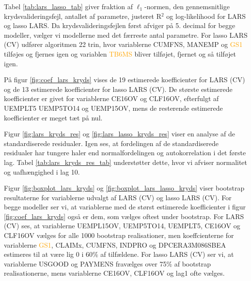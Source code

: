 
Tabel \ref{tab:lars_lasso_tab} giver fraktion af \(\ell_1\)-normen, den gennemsnitlige krydsvalideringsfejl, antallet af parametre, justeret R$^2$ og log-likelihood for LARS og lasso LARS.
Da krydsvalideringsfejlen først afviger på 5. decimal for begge modeller, vælger vi modellerne med det færreste antal parametre. 
For lasso LARS (CV) udfører algoritmen 22 trin, hvor variablerne  \textcolor{chartreuse4}{CUMFNS}, \textcolor{blue3}{MANEMP} og \textcolor{orange}{GS1} tilføjes og fjernes igen og 
variablen \textcolor{orange}{TB6MS} bliver tilføjet, fjernet og så tilføjet igen.  

%

%
På figur \ref{fig:coef_lars_kryds} vises de 19 estimerede koefficienter for LARS (CV) og de 13 estimerede koefficienter for lasso LARS (CV). 
De største estimerede koefficienter er givet for variablerne \textcolor{blue3}{CE16OV} og \textcolor{blue3}{CLF16OV}, efterfulgt af \textcolor{blue3}{UEMPLT5} \textcolor{blue3}{UEMP5TO14} og \textcolor{blue3}{UEMP15OV}, mens de resterende estimerede koefficienter er meget tæt på nul.



Figur \ref{fig:lars_kryds_res} og \ref{fig:lars_lasso_kryds_res} viser en analyse af de standardiserede residualer.
Igen ses, at fordelingen af de standardiserede residualer har tungere haler end normalfordelingen og autokorrelation i det første lag. 
Tabel \ref{tab:lars_kryds_res_tab} understøtter dette, hvor vi afviser normalitet og uafhængighed i lag 10. 

Figur \ref{fig:boxplot_lars_kryds} og \ref{fig:boxplot_lars_lasso_kryds} viser bootstrap resultaterne for variablerne udvalgt af LARS (CV) og lasso LARS (CV). 
For begge modeller ser vi, at variablerne med de størst estimerede koefficienter i figur \ref{fig:coef_lars_kryds} også er dem, som vælges oftest under bootstrap. 
For LARS (CV) ses, at variablerne \textcolor{blue3}{UEMPL15OV}, \textcolor{blue3}{UEMP5TO14}, \textcolor{blue3}{UEMPLT5}, \textcolor{blue3}{CE16OV} og \textcolor{blue3}{CLF16OV} vælges for alle 1000 bootstrap realisationer, men koeffcienterne for variablerne \textcolor{orange}{GS1}, \textcolor{blue3}{CLAIMx}, \textcolor{chartreuse4}{CUMFNS}, \textcolor{chartreuse4}{INDPRO} og \textcolor{red3}{DPCERA3M086SBEA} estimeres til at være lig 0 i 60\% af tilfældene.
For lasso LARS (CV) ser vi, at variablerne \textcolor{blue3}{USGOOD} og \textcolor{blue3}{PAYMENS} fravælges over 75\% af bootstrap realisationerne, mens variablerne \textcolor{blue3}{CE16OV}, \textcolor{blue3}{CLF16OV} og \textcolor{blue3}{lag1} ofte vælges. 

